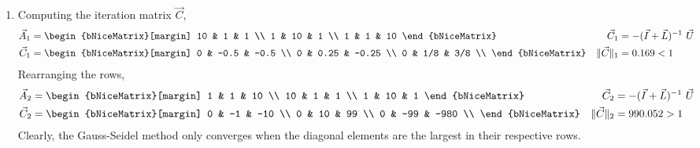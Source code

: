 \begin{enumerate}
    \item Computing the iteration matrix $ \vec{C} $,
          \begin{align}
              \vec{A}_1               & = \begin{bNiceMatrix}[margin]
                                              10 & 1  & 1  \\
                                              1  & 10 & 1  \\
                                              1  & 1  & 10
                                          \end{bNiceMatrix}        &
              \vec{C}_1               & = -(\vec{I} + \vec{L})^{-1}\ \vec{U} \\
              \vec{C}_1               & = \begin{bNiceMatrix}[margin]
                                              0 & -0.5 & -0.5  \\
                                              0 & 0.25 & -0.25 \\
                                              0 & 1/8  & 3/8   \\
                                          \end{bNiceMatrix}        &
              \lVert \vec{C} \rVert_1 & = 0.169 < 1
          \end{align}
          Rearranging the rows,
          \begin{align}
              \vec{A}_2               & = \begin{bNiceMatrix}[margin]
                                              1  & 1  & 10 \\
                                              10 & 1  & 1  \\
                                              1  & 10 & 1
                                          \end{bNiceMatrix}        &
              \vec{C}_2               & = -(\vec{I} + \vec{L})^{-1}\ \vec{U} \\
              \vec{C}_2               & = \begin{bNiceMatrix}[margin]
                                              0 & -1  & -10  \\
                                              0 & 10  & 99   \\
                                              0 & -99 & -980 \\
                                          \end{bNiceMatrix}        &
              \lVert \vec{C} \rVert_2 & = 990.052 > 1
          \end{align}
          Clearly, the Gauss-Seidel method only converges when the diagonal elements
          are the largest in their respective rows.


\end{enumerate}
